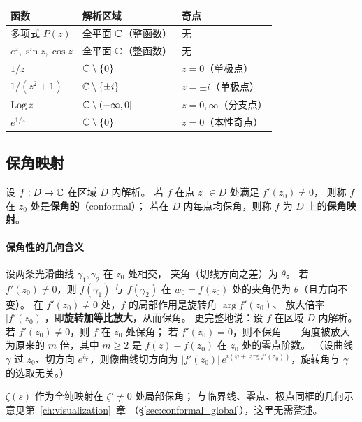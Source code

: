\begin{center}
\renewcommand{\arraystretch}{1.7}
\begin{tabular}{lll}
\toprule
函数 & 解析区域 & 奇点 \\
\midrule
多项式 $P(z)$ & 全平面 $\mathbb{C}$（整函数） & 无 \\
$e^z,\sin z,\cos z$ & 全平面 $\mathbb{C}$（整函数） & 无 \\
$1/z$ & $\mathbb{C}\setminus\{0\}$ & $z=0$（单极点）\\
$1/(z^2+1)$ & $\mathbb{C}\setminus\{\pm i\}$ & $z=\pm i$（单极点）\\
$\operatorname{Log} z$ & $\mathbb{C}\setminus(-\infty,0]$ & $z=0, \infty$（分支点）\\
$e^{1/z}$ & $\mathbb{C}\setminus\{0\}$ & $z=0$（本性奇点）\\
\bottomrule
\end{tabular}
\end{center}


\subsection{保角映射}\label{sec:conformal}

\label{def:conformal}
设 $f:D\to\mathbb{C}$ 在区域 $D$ 内解析。
若 $f$ 在点 $z_0\in D$ 处满足 $f'(z_0)\ne0$，
则称 $f$ 在 $z_0$ 处是\textbf{保角的}（conformal）；
若在 $D$ 内每点均保角，则称 $f$ 为 $D$ 上的\textbf{保角映射}。

\paragraph{保角性的几何含义}
设两条光滑曲线 $\gamma_1,\gamma_2$ 在 $z_0$ 处相交，
夹角（切线方向之差）为 $\theta$。
若 $f'(z_0)\ne0$，则 $f(\gamma_1)$ 与 $f(\gamma_2)$
在 $w_0=f(z_0)$ 处的夹角仍为 $\theta$（且方向不变）。
在 $f'(z_0)\ne0$ 处，$f$ 的局部作用是旋转角 $\arg f'(z_0)$、
放大倍率 $|f'(z_0)|$，即\textbf{旋转加等比放大}，从而保角。
\label{thm:conformal}
更完整地说：设 $f$ 在区域 $D$ 内解析。
若 $f'(z_0)\ne0$，则 $f$ 在 $z_0$ 处保角；
若 $f'(z_0)=0$，则不保角——角度被放大为原来的 $m$ 倍，其中
$m\ge 2$ 是 $f(z)-f(z_0)$ 在 $z_0$ 处的零点阶数。
（设曲线 $\gamma$ 过 $z_0$、切方向 $e^{i\varphi}$，则像曲线切方向为
$|f'(z_0)|\,e^{i(\varphi+\arg f'(z_0))}$，旋转角与 $\gamma$ 的选取无关。）

$\zeta(s)$ 作为全纯映射在 $\zeta'\ne0$ 处局部保角；
与临界线、零点、极点同框的几何示意见第~\ref{ch:visualization}~章
（§\ref{sec:conformal_global}），这里无需赘述。


